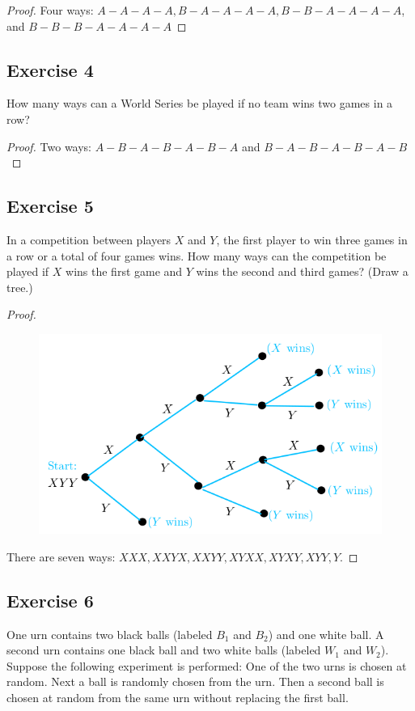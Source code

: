 \documentclass[14pt]{extarticle}
\begin{document}
\begin{proof}
     Four ways: \(A-A-A-A, B-A-A-A-A, B-B-A-A-A-A\), and \(B-B-B-A-A-A-A\)
\end{proof}

\subsection{Exercise 4}
How many ways can a World Series be played if no team wins two games in a row?

\begin{proof}
     Two ways: \(A-B-A-B-A-B-A\) and \(B-A-B-A-B-A-B\)
\end{proof}

\subsection{Exercise 5}
In a competition between players $X$ and $Y$, the first player to win three games in a row or a total of four games
wins. How many ways can the competition be played if $X$ wins the first game and $Y$ wins the second and third
games? (Draw a tree.)

\begin{proof}
     \begin{figure}[ht!]
          \centering
          \includegraphics[scale=0.31]{../images/9.2.5.png}
     \end{figure}

     There are seven ways: \(XXX, XXYX, XXYY, XYXX, XYXY, XYY, Y\).
\end{proof}

\subsection{Exercise 6}
One urn contains two black balls (labeled \(B_1\) and \(B_2\)) and one white ball. A second urn contains one black
ball and two white balls (labeled \(W_1\) and \(W_2\)). Suppose the following experiment is performed: One of the
two urns is chosen at random. Next a ball is randomly chosen from the urn. Then a second ball is chosen at random
from the same urn without replacing the first ball.
\end{document}
